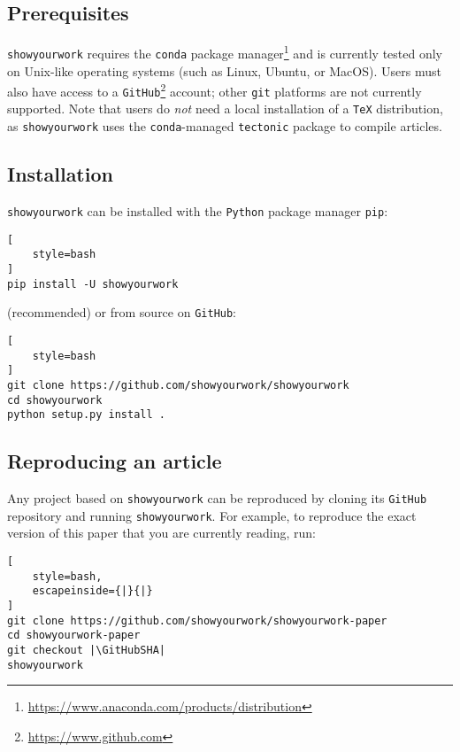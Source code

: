\documentclass[modern]{aastex631}
\newcommand\syw{\texttt{showyourwork}\xspace}
\begin{document}
\subsection{Prerequisites}
\label{sec:usage:prereq}
\syw requires the \texttt{conda} package manager\footnote{\url{https://www.anaconda.com/products/distribution}} and is currently tested only on Unix-like operating systems (such as Linux, Ubuntu, or MacOS).
Users must also have access to a \texttt{GitHub}\footnote{\url{https://www.github.com}} account; other \texttt{git} platforms are not currently supported.
Note that users do \emph{not} need a local installation of a \texttt{TeX} distribution, as \syw uses the \texttt{conda}-managed \texttt{tectonic} package to compile articles.

\subsection{Installation}
\label{sec:usage:install}
\syw can be installed with the \texttt{Python} package manager \texttt{pip}:\\

\noindent\begin{minipage}{\linewidth}
\begin{lstlisting}[
    style=bash
]
pip install -U showyourwork
\end{lstlisting}
\end{minipage}

\noindent (recommended) or from source on \texttt{GitHub}:\\

\noindent\begin{minipage}{\linewidth}
\begin{lstlisting}[
    style=bash
]
git clone https://github.com/showyourwork/showyourwork
cd showyourwork
python setup.py install .
\end{lstlisting}
\end{minipage}

\subsection{Reproducing an article}
\label{sec:usage:reproduce}
Any project based on \syw can be reproduced by cloning its \texttt{GitHub} repository and running \syw. For example, to reproduce the exact version of this paper that you are currently reading, run:\\

\noindent\begin{minipage}{\linewidth}
\begin{lstlisting}[
    style=bash,
    escapeinside={|}{|}
]
git clone https://github.com/showyourwork/showyourwork-paper
cd showyourwork-paper
git checkout |\GitHubSHA|
showyourwork
\end{lstlisting}
\end{minipage}
\end{document}
